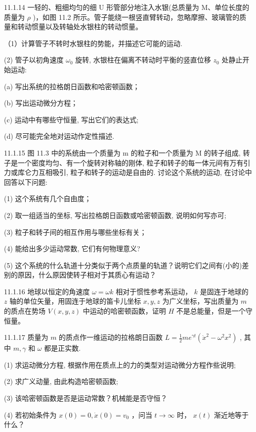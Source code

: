 \begin{problem}{11.1.14}
一轻的、粗细均匀的细 U 形管部分地注入水银(总质量为 M、单位长度的质量为 $\rho$ )，如图 11.2 所示。管子能绕一根竖直臂转动，忽略摩擦、玻璃管的质量和转动惯量以及转轴处水银柱的转动惯量。

（1）计算管子不转时水银柱的势能，并描述它可能的运动.

(2) 管子以初角速度 $\omega_{0}$ 旋转, 水银柱在偏离不转动时平衡的竖直位移 $z_{0}$ 处静止开始运动:

(a) 写出系统的拉格朗日函数和哈密顿函数；

(b) 写出运动微分方程；

(c) 运动中有哪些守恒量, 写出它们的表达式;

(d) 尽可能完全地对运动作定性描述.
\begin{center}

\end{center}
\end{problem}
\clearpage


\begin{problem}{11.1.15}
图 11.3 中的系统由一个质量为 m 的粒子和一个质量为 M 的转子组成, 转子是一个密度均匀、有一个旋转对称轴的刚体, 粒子和转子的每一体元间有万有引力或库仑力互相吸引, 粒子和转子的运动是自由的. 讨论这个系统的运动, 在讨论中回答以下问题:

(1) 这个系统有几个自由度；

(2) 取一组适当的坐标, 写出拉格朗日函数或哈密顿函数, 说明如何写亦可;

(3) 粒子和转子间的相互作用与哪些坐标有关；

(4) 能给出多少运动常数, 它们有何物理意义?

(5) 这个系统的什么轨道十分类似于两个点质量的轨道？说明它们之间有(小的)差别的原因，什么原因使转子相对于其质心有运动？
\begin{center}

\end{center}
\end{problem}
\clearpage


\begin{problem}{11.1.16}
地球以恒定的角速度 $\omega = \omega k$ 相对于惯性参考系运动， $k$ 是固连于地球的 $z$ 轴的单位矢量，用固连于地球的笛卡儿坐标 $x, y, z$ 为广义坐标，写出质量为 $m$ 的质点在势场 $V(x, y, z)$ 中运动的哈密顿函数，证明 $H$ 不是总能量，但是一个守恒量。
\end{problem}
\clearpage


\begin{problem}{11.1.17}
质量为 $m$ 的质点作一维运动的拉格朗日函数 $L = \frac{1}{2} m e^{\gamma t} (\dot{x}^2 - \omega^2 x^2)$ , 其中 $m, \gamma$ 和 $\omega$ 都是正实数.

(1) 求运动微分方程, 根据作用在质点上的力的类型对运动微分方程作些说明;

(2) 求广义动量, 由此构造哈密顿函数;

(3) 该哈密顿函数是否是运动常数？机械能是否守恒？

(4) 若初始条件为 $x(0) = 0, \dot{x}(0) = v_0$ ，问当 $t \to \infty$ 时， $x(t)$ 渐近地等于什么？
\end{problem}
\clearpage


